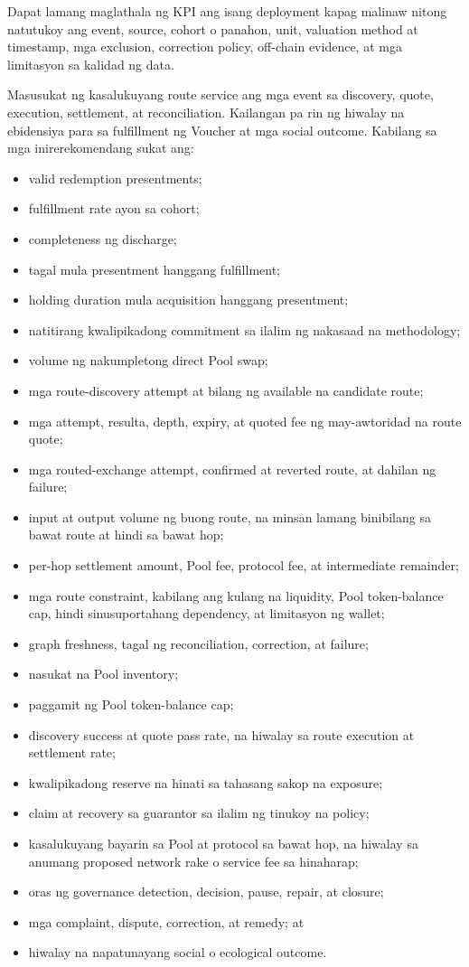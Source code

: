 \documentclass[11pt]{article}
\begin{document}
Dapat lamang maglathala ng KPI ang isang deployment kapag malinaw nitong natutukoy ang event, source, cohort o panahon, unit, valuation method at timestamp, mga exclusion, correction policy, off-chain evidence, at mga limitasyon sa kalidad ng data.

Masusukat ng kasalukuyang route service ang mga event sa discovery, quote, execution, settlement, at reconciliation. Kailangan pa rin ng hiwalay na ebidensiya para sa fulfillment ng Voucher at mga social outcome. Kabilang sa mga inirerekomendang sukat ang:

\begin{itemize}[leftmargin=*]
\item valid redemption presentments;
\item fulfillment rate ayon sa cohort;
\item completeness ng discharge;
\item tagal mula presentment hanggang fulfillment;
\item holding duration mula acquisition hanggang presentment;
\item natitirang kwalipikadong commitment sa ilalim ng nakasaad na methodology;
\item volume ng nakumpletong direct Pool swap;
\item mga route-discovery attempt at bilang ng available na candidate route;
\item mga attempt, resulta, depth, expiry, at quoted fee ng may-awtoridad na route quote;
\item mga routed-exchange attempt, confirmed at reverted route, at dahilan ng failure;
\item input at output volume ng buong route, na minsan lamang binibilang sa bawat route at hindi sa bawat hop;
\item per-hop settlement amount, Pool fee, protocol fee, at intermediate remainder;
\item mga route constraint, kabilang ang kulang na liquidity, Pool token-balance cap, hindi sinusuportahang dependency, at limitasyon ng wallet;
\item graph freshness, tagal ng reconciliation, correction, at failure;
\item nasukat na Pool inventory;
\item paggamit ng Pool token-balance cap;
\item discovery success at quote pass rate, na hiwalay sa route execution at settlement rate;
\item kwalipikadong reserve na hinati sa tahasang sakop na exposure;
\item claim at recovery sa guarantor sa ilalim ng tinukoy na policy;
\item kasalukuyang bayarin sa Pool at protocol sa bawat hop, na hiwalay sa anumang proposed network rake o service fee sa hinaharap;
\item oras ng governance detection, decision, pause, repair, at closure;
\item mga complaint, dispute, correction, at remedy; at
\item hiwalay na napatunayang social o ecological outcome.
\end{itemize}
\end{document}
